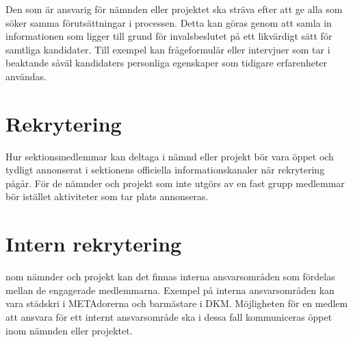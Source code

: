 \documentclass{dgovdoc}
\begin{document}
Den som är ansvarig för nämnden eller projektet ska sträva efter att ge alla som söker samma förutsättningar i processen. Detta kan göras genom att samla in informationen som ligger till grund  för  invalsbeslutet  på  ett  likvärdigt  sätt  för  samtliga  kandidater.  Till exempel kan frågeformulär  eller  intervjuer  som  tar  i  beaktande  såväl  kandidaters  personliga egenskaper som tidigare erfarenheter användas.

\section*{Rekrytering}
Hur  sektionsmedlemmar  kan  deltaga  i  nämnd  eller  projekt  bör  vara  öppet  och  tydligt annonserat i sektionens officiella informationskanaler när rekrytering pågår. För de nämnder och projekt som inte utgörs av en fast grupp medlemmar bör istället aktiviteter som tar plats annonseras.

\section*{Intern rekrytering}
nom  nämnder  och  projekt  kan  det  finnas  interna  ansvarsområden  som  fördelas  mellan  de engagerade   medlemmarna.   Exempel   på   interna   ansvarsområden   kan   vara   städskri   i METAdorerna och barmästare i DKM. Möjligheten för en medlem att ansvara för ett internt ansvarsområde ska i dessa fall kommuniceras öppet inom nämnden eller projektet.
\end{document}
